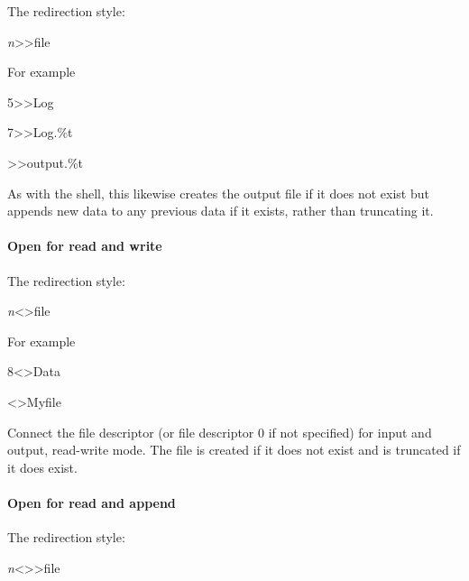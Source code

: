 The redirection style:

\begin{expara}

\textit{n}{\textgreater}{\textgreater}file

\end{expara}

For example

\begin{expara}

5{\textgreater}{\textgreater}Log

7{\textgreater}{\textgreater}Log.\%t

{\textgreater}{\textgreater}output.\%t

\end{expara}

As with the shell, this likewise creates the output file if it does not exist but appends new data to any previous data if it exists,
rather than truncating it.

\paragraph{Open for read and write}

The redirection style:

\begin{expara}

\textit{n}{\textless}{\textgreater}file

\end{expara}

For example

\begin{expara}

8{\textless}{\textgreater}Data

{\textless}{\textgreater}Myfile

\end{expara}

Connect the file descriptor (or file descriptor 0 if not specified) for input and output, read-write mode. The file is created if it
does not exist and is truncated if it does exist.

\paragraph{Open for read and append}

The redirection style:

\begin{expara}

\textit{n}{\textless}{\textgreater}{\textgreater}file

\end{expara}

